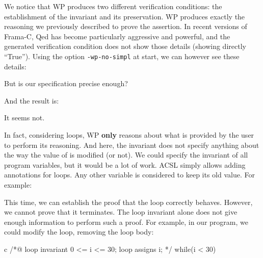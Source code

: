 

We notice that WP produces two different verification conditions: the
establishment of the invariant and its preservation. WP produces exactly
the reasoning we previously described to prove the assertion. In recent
versions of Frama-C, Qed has become particularly aggressive and
powerful, and the generated verification condition does not show those details
(showing directly ``True''). Using the option \texttt{-wp-no-simpl} at
start, we can however see these details:





But is our specification precise enough?






And the result is:





It seems not.





In fact, considering loops, WP \textbf{only} reasons about what is
provided by the user to perform its reasoning. And here, the invariant
does not specify anything about the way the value of  is
modified (or not). We could specify the invariant of all program
variables, but it would be a lot of work. ACSL simply allows adding
 annotations for loops. Any other variable is considered
to keep its old value. For example:






This time, we can establish the proof that the loop correctly behaves.
However, we cannot prove that it terminates. The loop invariant alone
does not give enough information to perform such a proof. For example,
in our program, we could modify the loop, removing the loop body:



\begin{CodeBlock}{c}
/*@
  loop invariant 0 <= i <= 30;
  loop assigns i;
*/
while(i < 30){

}
\end{CodeBlock}



